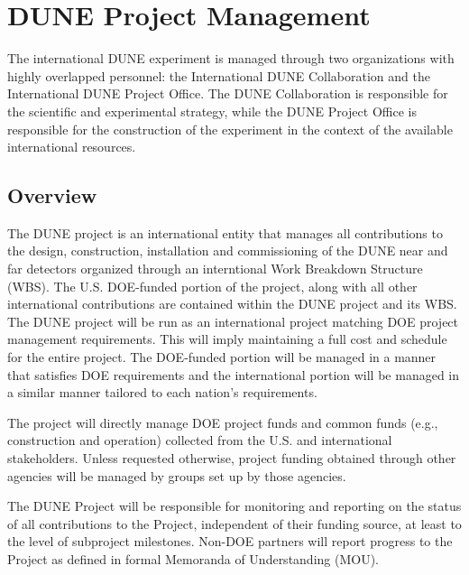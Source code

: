 \chapter{DUNE Project Management}
\label{ch:detectors-pm}

The international DUNE experiment is managed through two organizations
with highly overlapped personnel: the International DUNE Collaboration
and the International DUNE Project Office. The DUNE Collaboration is
responsible for the scientific and experimental strategy, while the
DUNE Project Office is responsible for the construction of the
experiment in the context of the available international resources.


\section{Overview}

The DUNE project is an international entity that manages
all contributions to the design, construction, installation and
commissioning of the DUNE near and far detectors organized through an
interntional Work Breakdown Structure (WBS). The U.S. DOE-funded
portion of the project, along with all other international
contributions are contained within the DUNE project and its WBS. The DUNE project
will be run as an international project matching DOE project management
requirements. This will imply maintaining a full cost and schedule for
the entire project.  The DOE-funded portion will be managed in a
manner that satisfies DOE requirements and the international
portion will be managed in a similar manner tailored to each
nation's requirements.

The project will directly manage DOE project funds and 
common funds (e.g., construction and operation) collected from the
U.S. and international stakeholders. Unless requested otherwise,
project funding obtained through other agencies will be managed
by groups set up by those agencies.

The DUNE Project will be responsible for monitoring and reporting on
the status of all contributions to the Project, independent of their
funding source, at least to the level of subproject milestones.
Non-DOE partners will report progress to the Project as defined in
formal Memoranda of Understanding (MOU).


